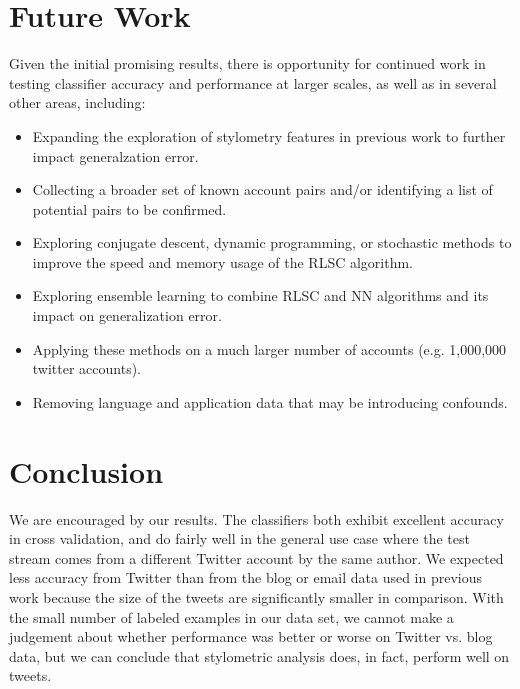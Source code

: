\documentclass[10pt, conference, compsocconf]{IEEEtran}
\begin{document}
\section {Future Work}

Given the initial promising results, there is opportunity for
continued work in testing classifier accuracy and performance at
larger scales, as well as in several other areas, including:

\begin{itemize}
\item Expanding the exploration of stylometry features in previous work to further impact generalzation error.
\item Collecting a broader set of known account pairs and/or identifying a list of potential pairs to be confirmed.
\item Exploring conjugate descent, dynamic programming,  or stochastic methods to improve the speed and memory usage of the RLSC algorithm.
\item Exploring ensemble learning to combine RLSC and NN algorithms and its impact on generalization error.
\item Applying these methods on a much larger number of accounts (e.g. 1,000,000 twitter accounts).
\item Removing language and application data that may be introducing confounds.
\end{itemize}

\section{Conclusion}

We are encouraged by our results. The classifiers both exhibit
excellent accuracy in cross validation, and do fairly well in the
general use case where the test stream comes from a different Twitter
account by the same author. We expected less accuracy from Twitter
than from the blog or email data used in previous work because the
size of the tweets are significantly smaller in comparison. With the
small number of labeled examples in our data set, we cannot make a
judgement about whether performance was better or worse on Twitter
vs. blog data, but we can conclude that stylometric analysis does, in
fact, perform well on tweets.
\end{document}
